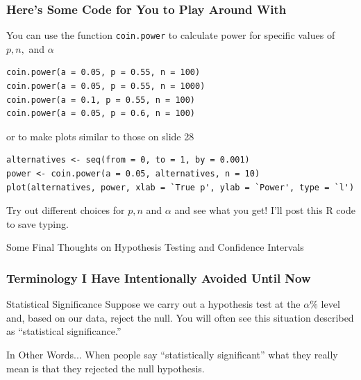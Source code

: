 \documentclass[handout]{beamer}
\begin{document}

\begin{frame}[fragile]
\frametitle{Here's Some Code for You to Play Around With}
\footnotesize
You can use the function \texttt{coin.power} to calculate power for specific values of $p, n,$ and $\alpha$
\begin{verbatim}
coin.power(a = 0.05, p = 0.55, n = 100)
coin.power(a = 0.05, p = 0.55, n = 1000)
coin.power(a = 0.1, p = 0.55, n = 100)
coin.power(a = 0.05, p = 0.6, n = 100)
\end{verbatim}
or to make plots similar to those on slide 28
\begin{verbatim}
alternatives <- seq(from = 0, to = 1, by = 0.001)
power <- coin.power(a = 0.05, alternatives, n = 10)
plot(alternatives, power, xlab = `True p', ylab = `Power', type = `l')
\end{verbatim}
Try out different choices for $p,n$ and $\alpha$ and see what you get! I'll post this R code to save typing.

\end{frame}




\begin{frame}
\begin{center}
	\huge Some Final Thoughts on Hypothesis Testing and Confidence Intervals
\end{center}
\end{frame}
\begin{frame}
\frametitle{Terminology I Have Intentionally Avoided Until Now}

\begin{block}{Statistical Significance}
Suppose we carry out a hypothesis test at the $\alpha\%$ level and,  based on our data, reject the null. You will often see this situation described as ``statistical significance.''
\end{block}

\begin{block}{In Other Words...}
When people say ``statistically significant'' what they really mean is that they rejected the null hypothesis.
\end{block}
\end{frame}
\end{document}
